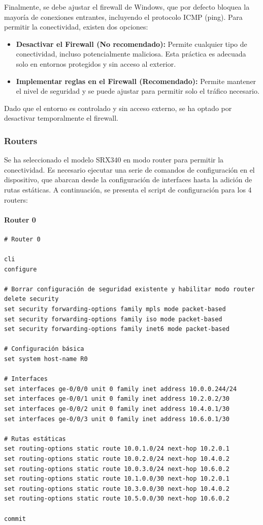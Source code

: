 \documentclass[%
    school=etsisi,%
    degree=61TI,%
]{upm-report}
\begin{document}
Finalmente, se debe ajustar el firewall de Windows, que por defecto bloquea la mayoría de conexiones entrantes, incluyendo el protocolo ICMP (ping). Para permitir la conectividad, existen dos opciones:
\begin{itemize}
    \item \textbf{Desactivar el Firewall (No recomendado):} Permite cualquier tipo de conectividad, incluso potencialmente maliciosa. Esta práctica es adecuada solo en entornos protegidos y sin acceso al exterior.
    \item \textbf{Implementar reglas en el Firewall (Recomendado):} Permite mantener el nivel de seguridad y se puede ajustar para permitir solo el tráfico necesario.
\end{itemize}

Dado que el entorno es controlado y sin acceso externo, se ha optado por desactivar temporalmente el firewall.

\subsubsection{Routers}

Se ha seleccionado el modelo SRX340 en modo router para permitir la conectividad. Es necesario ejecutar una serie de comandos de configuración en el dispositivo, que abarcan desde la configuración de interfaces hasta la adición de rutas estáticas. A continuación, se presenta el script de configuración para los 4 routers:

\paragraph{Router 0}

\begin{lstlisting}[breaklines]
# Router 0

cli
configure

# Borrar configuración de seguridad existente y habilitar modo router
delete security
set security forwarding-options family mpls mode packet-based
set security forwarding-options family iso mode packet-based
set security forwarding-options family inet6 mode packet-based

# Configuración básica
set system host-name R0

# Interfaces
set interfaces ge-0/0/0 unit 0 family inet address 10.0.0.244/24
set interfaces ge-0/0/1 unit 0 family inet address 10.2.0.2/30
set interfaces ge-0/0/2 unit 0 family inet address 10.4.0.1/30
set interfaces ge-0/0/3 unit 0 family inet address 10.6.0.1/30

# Rutas estáticas
set routing-options static route 10.0.1.0/24 next-hop 10.2.0.1
set routing-options static route 10.0.2.0/24 next-hop 10.4.0.2
set routing-options static route 10.0.3.0/24 next-hop 10.6.0.2
set routing-options static route 10.1.0.0/30 next-hop 10.2.0.1
set routing-options static route 10.3.0.0/30 next-hop 10.4.0.2
set routing-options static route 10.5.0.0/30 next-hop 10.6.0.2

commit
\end{lstlisting}
\end{document}
